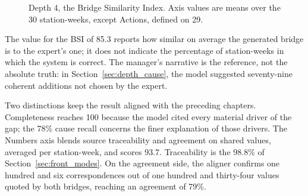\documentclass[12pt,a4paper,openright,twoside]{book}
\begin{document}
\begin{figure}[htbp]
  \centering

  \caption{Depth 4, the Bridge Similarity Index. Axis values are means over the 30 station-weeks, except Actions, defined on 29.}
  \label{fig:depth_bsi}
\end{figure}
\FloatBarrier

The value for the \ac{BSI} of 85.3 reports how similar on average the generated bridge is to the expert's one; it does not indicate the percentage of station-weeks in which the system is correct.
The manager's narrative is the reference, not the absolute truth: in Section~\ref{sec:depth_cause}, the model suggested seventy-nine coherent additions not chosen by the expert.

Two distinctions keep the result aligned with the preceding chapters.
Completeness reaches 100 because the model cited every material driver of the gap; the 78\% cause recall concerns the finer explanation of those drivers.
The Numbers axis blends source traceability and agreement on shared values, averaged per station-week, and scores 93.7.
Traceability is the 98.8\% of Section~\ref{sec:front_modes}.
On the agreement side, the aligner confirms one hundred and six correspondences out of one hundred and thirty-four values quoted by both bridges, reaching an agreement of 79\%.
\end{document}
